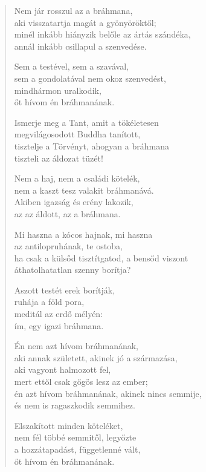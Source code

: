 \begin{verse}
 Nem jár rosszul az a bráhmana,\\
aki visszatartja magát a gyönyöröktől;\\
minél inkább hiányzik belőle az ártás szándéka,\\
annál inkább csillapul a szenvedése.

 Sem a testével, sem a szavával,\\
sem a gondolatával nem okoz szenvedést,\\
mindhármon uralkodik,\\
őt hívom én bráhmanának.

\newpage

 Ismerje meg a Tant, amit a tökéletesen\\
megvilágosodott Buddha tanított,\\
tisztelje a Törvényt, ahogyan a bráhmana\\
tiszteli az áldozat tüzét!

 Nem a haj, nem a családi kötelék,\\
nem a kaszt tesz valakit bráhmanává.\\
Akiben igazság és erény lakozik,\\
az az áldott, az a bráhmana.

 Mi haszna a kócos hajnak, mi haszna\\
az antilopruhának, te ostoba,\\
ha csak a külsőd tisztítgatod, a bensőd viszont\\
áthatolhatatlan szenny borítja?

 Aszott testét erek borítják,\\
ruhája a föld pora,\\
meditál az erdő mélyén:\\
ím, egy igazi bráhmana.

 Én nem azt hívom bráhmanának,\\
aki annak született, akinek jó a származása,\\
aki vagyont halmozott fel,\\
mert ettől csak gőgös lesz az ember;\\
én azt hívom bráhmanának, akinek nincs semmije,\\
és nem is ragaszkodik semmihez.

\newpage

 Elszakított minden köteléket,\\
nem fél többé semmitől, legyőzte\\
a hozzátapadást, függetlenné vált,\\
őt hívom én bráhmanának.


\end{verse}
